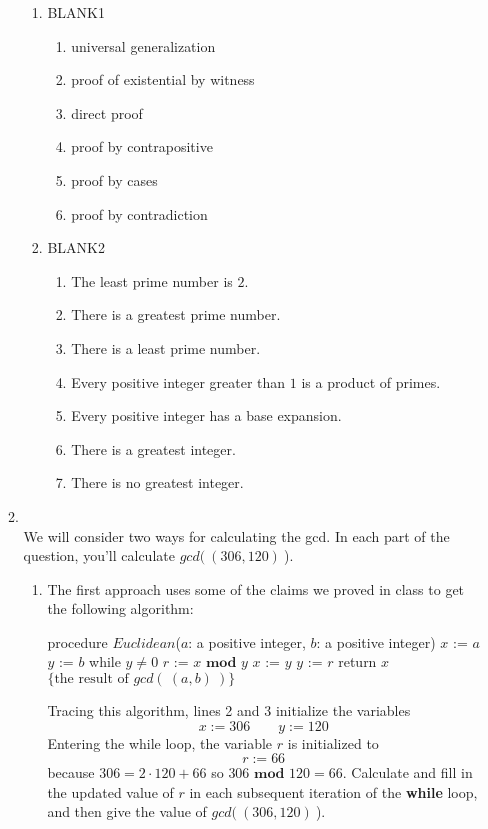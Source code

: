 \documentclass[12pt, oneside]{article}
\begin{document}
\begin{enumerate}
\begin{enumerate}
\begin{enumerate}
\item BLANK1
    \begin{enumerate}
        \item universal generalization
        \item proof of existential by witness
        \item direct proof
        \item proof by contrapositive
        \item proof by cases
        \item proof by contradiction
    \end{enumerate}
\item BLANK2
\begin{enumerate}
    \item The least prime number is $2$.
    \item There is a greatest prime number.
    \item There is a least prime number.
    \item Every positive integer greater than $1$ is a product of primes.
    \item Every positive integer has a base expansion.
    \item There is a greatest integer.
    \item There is no greatest integer.
\end{enumerate}
\end{enumerate}         \item \hspace{1in}\\ 

We will consider two ways for calculating the gcd. In each 
part of the question, you'll calculate $gcd(~(306, 120)~$).

\begin{enumerate}
\item The first approach uses some of the claims we proved in class
to get the following algorithm:


\begin{algorithm}[caption={Euclidean algorithm for calculating greatest common divisor}]
    procedure $\textit{Euclidean}$($a$: a positive integer, $b$: a positive integer)
    $x$ := $a$
    $y$ := $b$
    while $y \neq 0$
      $r$ := $x \textbf{ mod } y$
      $x$ := $y$
      $y$ := $r$
    return $x$ $\{ \textrm{the result of } gcd(~(a,b)~)\} $
\end{algorithm} 
Tracing this algorithm, lines 2 and 3 initialize the variables 
\[
    x:= 306 \qquad y:=120
\]
Entering the while loop, the variable $r$ is initialized to
\[
    r:= 66
\]
because $306 = 2 \cdot 120 + 66$ so $306 \textbf{ mod } 120 = 66$.
Calculate and fill in the updated value of $r$ in each subsequent iteration
of the {\bf while} loop, and then give the value of $gcd(~(306, 120)~$).


\end{enumerate}
\end{enumerate}
\end{enumerate}
\end{document}
